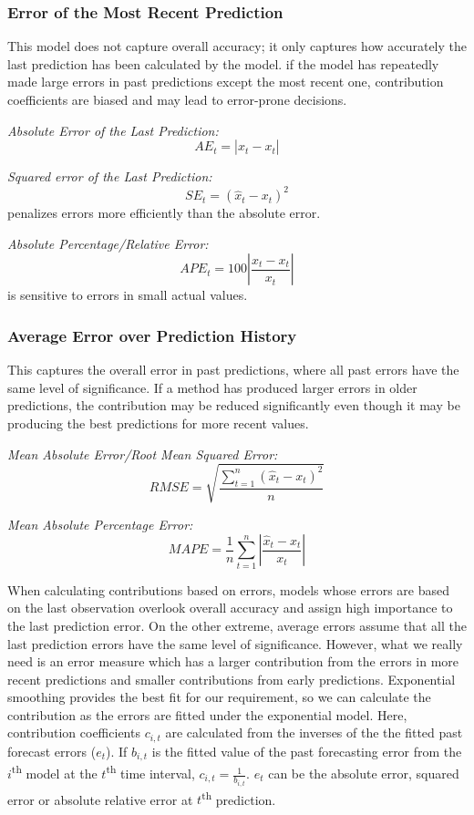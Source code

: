 \subsubsection{Error of the Most Recent Prediction}
This model does not capture overall accuracy; it only captures how accurately the last prediction has been calculated by the model. if the model has repeatedly made large errors in past predictions except the most recent one, contribution coefficients are biased and may lead to error-prone decisions.

\noindent
\textit{Absolute Error of the Last Prediction:}
$$AE_t=|\hat{x}_t-x_t|$$

\noindent
\textit{Squared error of the Last Prediction:}
$$SE_t=(\hat{x}_t-x_t)^2$$
penalizes errors more efficiently than the absolute error.

\noindent
\textit{Absolute Percentage/Relative Error:}
$$APE_t=100\left |\frac{\hat{x}_t-x_t}{x_t}  \right |$$
is sensitive to errors in small actual values.

\subsubsection{Average Error over Prediction History}
This captures the overall error in past predictions, where all past errors have the same level of significance. If a method has produced larger errors in older predictions, the contribution may be reduced significantly even though it may be producing the best predictions for more recent values.

\noindent
\textit{Mean Absolute Error/Root Mean Squared Error:}
$$RMSE=\sqrt{\frac{\sum_{t=1}^{n}(\hat{x}_{t}-x_{t})^{2}}{n}}$$ 

\noindent
\textit{Mean Absolute Percentage Error:}
$$MAPE=\frac{1}{n}\sum_{t=1}^{n}\left | \frac{\hat{x}_{t}-x_{t}}{x_{t}} \right |$$

When calculating contributions based on errors, models whose errors are based on the last observation overlook overall accuracy and assign high importance to the last prediction error. On the other extreme, average errors assume that all the last prediction errors have the same level of significance. However, what we really need is an error measure which has a larger contribution from the errors in more recent predictions and smaller contributions from early predictions. Exponential smoothing provides the best fit for our requirement, so we can calculate the contribution as the errors are fitted under the exponential model. Here, contribution coefficients $c_{i,t}$ are calculated from the inverses of the the fitted past forecast errors ($e_{t}$). If $b_{i,t}$ is the fitted value of the past forecasting error from the $i$\textsuperscript{th} model at the $t$\textsuperscript{th} time interval, $c_{i,t}=\frac{1}{b_{i,t}}$. $e_{t}$ can be the absolute error, squared error or absolute relative error at $t$\textsuperscript{th} prediction.

